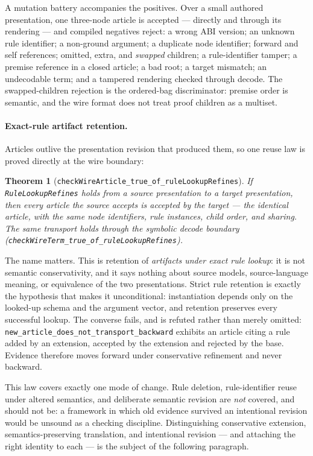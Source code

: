 \documentclass[]{article}
\newtheorem{theorem}{Theorem}
\theoremstyle{remark}
\newcommand{\code}[1]{\texttt{#1}}
\begin{document}
A mutation battery accompanies the positives.  Over a small authored
presentation, one three-node article is accepted --- directly and through
its rendering --- and compiled negatives reject: a wrong ABI version; an
unknown rule identifier; a non-ground argument; a duplicate node
identifier; forward and self references; omitted, extra, and \emph{swapped}
children; a rule-identifier tamper; a premise reference in a closed
article; a bad root; a target mismatch; an undecodable term; and a tampered
rendering checked through decode.  The swapped-children rejection is the
ordered-bag discriminator: premise order is semantic, and the wire format
does not treat proof children as a multiset.

\paragraph{Exact-rule artifact retention.}
Articles outlive the presentation revision that produced them, so one
reuse law is proved directly at the wire boundary:

\begin{theorem}[\code{checkWireArticle\_true\_of\_ruleLookupRefines}]
If \code{RuleLookupRefines} holds from a source presentation to a target
presentation, then every article the source accepts is accepted by the
target --- the \emph{identical} article, with the same node identifiers,
rule instances, child order, and sharing.  The same transport holds through
the symbolic decode boundary
(\code{checkWireTerm\_true\_of\_ruleLookupRefines}).
\end{theorem}

The name matters.  This is retention of \emph{artifacts under exact rule
lookup}: it is not semantic conservativity, and it says nothing about source
models, source-language meaning, or equivalence of the two presentations.
Strict rule retention is exactly the hypothesis that makes it
unconditional: instantiation depends only on the looked-up schema and the
argument vector, and retention preserves every successful lookup.  The
converse fails, and is refuted rather than merely omitted:
\code{new\_article\_does\_not\_transport\_backward} exhibits an article
citing a rule added by an extension, accepted by the extension and rejected
by the base.  Evidence therefore moves forward under conservative
refinement and never backward.

This law covers exactly one mode of change.  Rule deletion, rule-identifier
reuse under altered semantics, and deliberate semantic revision are
\emph{not} covered, and should not be: a framework in which old evidence
survived an intentional revision would be unsound as a checking discipline.
Distinguishing conservative extension, semantics-preserving translation, and
intentional revision --- and attaching the right identity to each --- is the
subject of the following paragraph.
\end{document}
